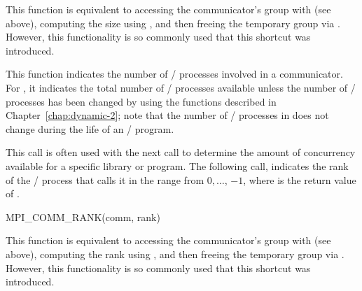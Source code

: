 \begin{rationale}
This function is equivalent to accessing the communicator's group with
 (see above), computing the size using
,
and then freeing the temporary group via . However,
this functionality is so commonly used that this shortcut was introduced.
\end{rationale}

\begin{users}
This function indicates the number of \MPI/ processes involved in a communicator.
For , it indicates the total number of \MPI/ processes
available unless
  the number of \MPI/ processes has been changed by using the functions
  described in Chapter~\ref{chap:dynamic-2}; note that the number of
  \MPI/ processes in  does not change during the
  life of an \MPI/ program.

This call is often used with the next call to determine the amount of
concurrency available for a specific library or program. The following
call,  indicates the rank of the \MPI/ process
that calls it in the range from $0,\ldots$, $-1$, where 
is the return value of .\end{users}

%
\begin{funcdef}{MPI\_COMM\_RANK}{(\mbox{comm}, \mbox{rank})}
\end{funcdef}

\begin{rationale}
This function is equivalent to accessing the communicator's group with
 (see above), computing the rank using
,
and then freeing the temporary group via . However,
this functionality is so commonly used that this shortcut was introduced.
\end{rationale}

